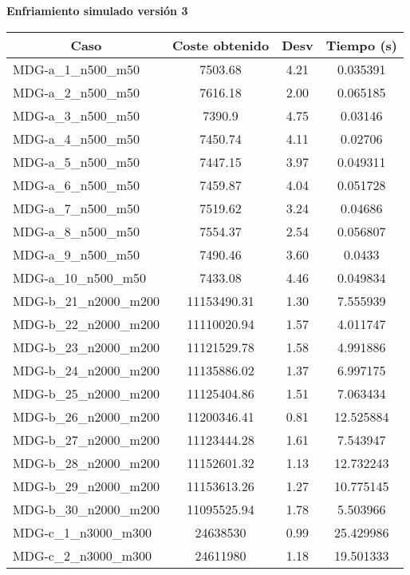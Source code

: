 \documentclass[11pt,a4paper]{article}
\begin{document}
\newpage
\textbf{Enfriamiento simulado versión 3}
\begin{table}[H]
	\begin{center}
		\begin{tabular}{|l|c|c|c|} 
			\hline
			\multicolumn{1}{|c|}{\textbf{Caso}} & \textbf{Coste obtenido} & \textbf{Desv} & \textbf{Tiempo (s)} \\ \hline
		MDG-a\_1\_n500\_m50 & 7503.68 & 4.21 & 0.035391 \\ \hline
		MDG-a\_2\_n500\_m50 & 7616.18 & 2.00 & 0.065185 \\ \hline
		MDG-a\_3\_n500\_m50 & 7390.9 & 4.75 & 0.03146 \\ \hline
		MDG-a\_4\_n500\_m50 & 7450.74 & 4.11 & 0.02706 \\ \hline
		MDG-a\_5\_n500\_m50 & 7447.15 & 3.97 & 0.049311 \\ \hline
		MDG-a\_6\_n500\_m50 & 7459.87 & 4.04 & 0.051728 \\ \hline
		MDG-a\_7\_n500\_m50 & 7519.62 & 3.24 & 0.04686 \\ \hline
		MDG-a\_8\_n500\_m50 & 7554.37 & 2.54 & 0.056807 \\ \hline
		MDG-a\_9\_n500\_m50 & 7490.46 & 3.60 & 0.0433 \\ \hline
		MDG-a\_10\_n500\_m50 & 7433.08 & 4.46 & 0.049834 \\ \hline
		MDG-b\_21\_n2000\_m200 & 11153490.31 & 1.30 & 7.555939 \\ \hline
		MDG-b\_22\_n2000\_m200 & 11110020.94 & 1.57 & 4.011747 \\ \hline
		MDG-b\_23\_n2000\_m200 & 11121529.78 & 1.58 & 4.991886 \\ \hline
		MDG-b\_24\_n2000\_m200 & 11135886.02 & 1.37 & 6.997175 \\ \hline
		MDG-b\_25\_n2000\_m200 & 11125404.86 & 1.51 & 7.063434 \\ \hline
		MDG-b\_26\_n2000\_m200 & 11200346.41 & 0.81 & 12.525884 \\ \hline
		MDG-b\_27\_n2000\_m200 & 11123444.28 & 1.61 & 7.543947 \\ \hline
		MDG-b\_28\_n2000\_m200 & 11152601.32 & 1.13 & 12.732243 \\ \hline
		MDG-b\_29\_n2000\_m200 & 11153613.26 & 1.27 & 10.775145 \\ \hline
		MDG-b\_30\_n2000\_m200 & 11095525.94 & 1.78 & 5.503966 \\ \hline
		MDG-c\_1\_n3000\_m300 & 24638530 & 0.99 & 25.429986 \\ \hline
		MDG-c\_2\_n3000\_m300 & 24611980 & 1.18 & 19.501333 \\ \hline

\end{tabular}
\end{center}
\end{table}
\end{document}
